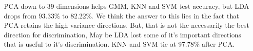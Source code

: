 \documentclass[11pt,a4paper]{article}
\begin{document}
\begin{minipage}{\linewidth}
PCA down to 39 dimensions helps GMM, KNN and SVM test accuracy, but LDA drops from 93.33\% to 82.22\%. We think the answer to this lies in the fact that PCA retains the high-variance directions. But, that is not the necessarily the best direction for discrimination, May be LDA lost some of it's important directions that is useful to it's discrimination. KNN and SVM tie at 97.78\% after PCA.


\end{minipage}\par\bigskip
\end{document}
